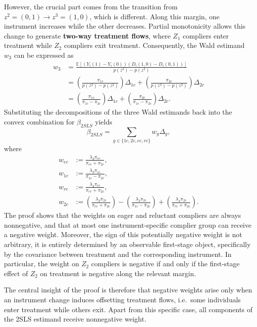\documentclass[
  12pt,
  a4paper,
  oneside]{article}
\begin{document}
However, the crucial part comes from the transition from
\(z^2 = (0,1) \rightarrow z^3 = (1,0)\), which is different. Along this
margin, one instrument increases while the other decreases. Partial
monotonicity allows this change to generate
\textbf{two-way treatment flows}, where \(Z_1\) compliers enter
treatment while \(Z_2\) compliers exit treatment. Consequently, the Wald
estimand \(w_3\) can be expressed as \begin{equation}
\begin{aligned}
w_3 &= \frac{\mathbb{E}[(Y_i(1) - Y_i(0))(D_i(1,0) - D_i(0,1))]}{p(z^3) - p(z^2)}\\ &= \left(\frac{\pi_{1c}}{p(z^3) - p(z^2)}\right)\Delta_{1c} + \left(\frac{\pi_{2c}}{p(z^3) - p(z^2)} \right)\Delta_{2c} \\ &= \left(\frac{\pi_{1c}}{\pi_{1c} - \pi_{2c}}\right)\Delta_{1c} + \left(\frac{\pi_{2c}}{\pi_{1c} - \pi_{2c}} \right)\Delta_{2c}.
\end{aligned}
\end{equation} Substituting the decompositions of the three Wald
estimands back into the convex combination for \(\beta_{2SLS}\) yields
\begin{equation}
\beta_{2SLS} = \sum_{g \in \{1c, 2c, ec, rc\}} w_g \Delta_g,
\end{equation} where \[
\begin{aligned}
w_{ec} &:= \frac{\lambda_{2}\pi_{ec}}{\pi_{ec} + \pi_{2c}}, \\
w_{1c} &:= \frac{\lambda_3 \pi_{1c}}{\pi_{1c} - \pi_{2c}}, \\
w_{rc} &:= \frac{\lambda_4 \pi_{rc}}{\pi_{rc} + \pi_{2c}}, \\
w_{2c} &:= 
\left(\frac{\lambda_{2}\pi_{2c}}{\pi_{ec} + \pi_{2c}}\right)
- \left(\frac{\lambda_3\pi_{2c}}{\pi_{1c} - \pi_{2c}}\right)
+ \left(\frac{\lambda_4 \pi_{2c}}{\pi_{rc} + \pi_{2c}}\right).
\end{aligned}
\] The proof shows that the weights on eager and reluctant compliers are
always nonnegative, and that at most one instrument-specific complier
group can receive a negative weight. Moreover, the sign of this
potentially negative weight is not arbitrary, it is entirely determined
by an observable first-stage object, specifically by the covariance
between treatment and the corresponding instrument. In particular, the
weight on \(Z_2\) compliers is negative if and only if the first-stage
effect of \(Z_2\) on treatment is negative along the relevant margin.

The central insight of the proof is therefore that negative weights
arise only when an instrument change induces offsetting treatment flows,
i.e.~some individuals enter treatment while others exit. Apart from this
specific case, all components of the 2SLS estimand receive nonnegative
weight.
\end{document}

